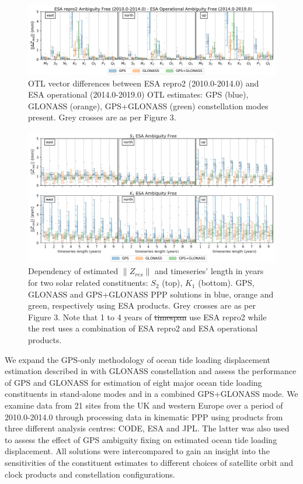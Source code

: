\documentclass[se, manuscript]{copernicus}
\providecommand{\DIFadd}[1]{{\protect\color{blue}\uwave{#1}}} %
\providecommand{\DIFdel}[1]{{\protect\color{red}\sout{#1}}}                      %
\providecommand{\DIFaddFL}[1]{\DIFadd{#1}} %
\providecommand{\DIFdelFL}[1]{\DIFdel{#1}} %
\providecommand{\DIFaddbeginFL}{} %
\providecommand{\DIFaddendFL}{} %
\providecommand{\DIFdelbeginFL}{} %
\providecommand{\DIFdelendFL}{} %
\begin{document}
\begin{figure}[t]
\includegraphics[width=17cm]{fig12.png}
\caption{OTL vector differences between ESA repro2 (2010.0-2014.0) and ESA operational (2014.0-2019.0) OTL estimates: GPS (blue), GLONASS (orange), GPS+GLONASS (green) constellation modes present. Grey crosses are as per Figure 3.}
\end{figure}



\begin{figure}[t]
\includegraphics[width=17cm]{fig11.png}
\caption{Dependency of estimated $\|Z_{res}\|$ and timeseries’ length in years for two solar related constituents: $S_2$ (top), $K_1$ (bottom). GPS, GLONASS and GPS+GLONASS PPP solutions in blue, orange and green, respectively using ESA products. Grey crosses are as per Figure 3. Note that 1 to 4 years of \DIFdelbeginFL \DIFdelFL{timespan }\DIFdelendFL \DIFaddbeginFL \DIFaddFL{timeseries length }\DIFaddendFL use ESA repro2 while the rest uses a combination of ESA repro2 and ESA operational products.}
\end{figure}

\conclusions %
We expand the GPS-only methodology of ocean tide loading displacement estimation described in \cite{Penna2015} with GLONASS constellation and assess the performance of GPS and GLONASS for estimation of eight major ocean tide loading constituents in stand-alone modes and in a combined GPS+GLONASS mode. We examine data from 21 sites from the UK and western Europe over a period of 2010.0-2014.0 through processing data in kinematic PPP using products from three different analysis centres: CODE, ESA and JPL. The latter was also used to assess the effect of GPS ambiguity fixing on estimated ocean tide loading displacement. All solutions were intercompared to gain an insight into the sensitivities of the constituent estimates to different choices of satellite orbit and clock products and constellation configurations.
\end{document}

